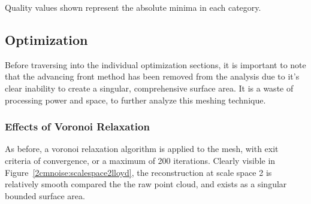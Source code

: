 \documentclass[12pt]{drexelthesis}
\let\Oldsubsection\subsection
\renewcommand{\subsection}{\FloatBarrier\Oldsubsection}
\let\Oldsubsubsection\subsubsection
\renewcommand{\subsubsection}{\FloatBarrier\Oldsubsubsection}
\begin{document}
\begin{table}[!ht]
	\centering
		\caption[Two centimeter noise induced initial mesh quality]{Initial quality analysis of simulated 2 centimeter noise surface mesh.}
	Quality values shown represent the absolute minima in each category.
	\label{table:2cmnoiseInit}
\end{table}



\subsection{Optimization}

Before traversing into the individual optimization sections, it is important to note that the advancing front method has been removed from the analysis due to it's clear inability to create a singular, comprehensive surface area. It is a waste of processing power and space, to further analyze this meshing technique.

\subsubsection{Effects of Voronoi Relaxation}

As before, a voronoi relaxation algorithm is applied to the mesh, with exit criteria of convergence, or a maximum of 200 iterations. Clearly visible in Figure~\ref{2cmnoise:scalespace2lloyd}, the reconstruction at scale space 2 is relatively smooth compared the the raw point cloud, and exists as a singular bounded surface area.
\end{document}
